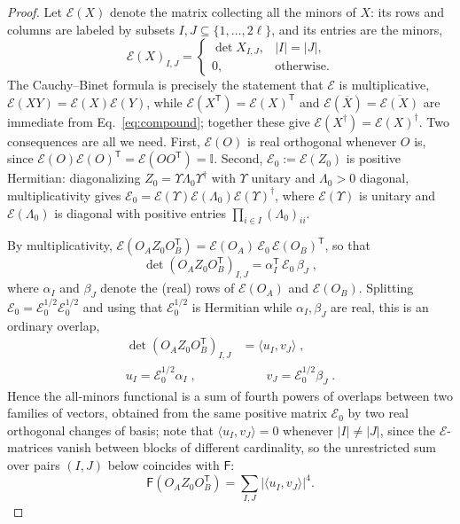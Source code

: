 \documentclass[prx,twocolumn,superscriptaddress,aps,10pt, frontmatterverbose, reprint,footinbib,longbibliography=true]{revtex4-2}
\newcommand{\trans}{\mathsf{T}}
\begin{document}
\begin{proof}
Let $\mathcal{E}(X)$ denote the matrix collecting all the minors of $X$: its rows and columns are labeled by subsets $I,J\subseteq \{1,\dots,2\ell\}$, and its entries are the minors,
\begin{equation}
    \mathcal{E}(X)_{I,J}=\begin{cases}\det X_{I,J}, & |I|=|J|,\\ 0,&\text{otherwise.}\end{cases}
    \label{eq:compound}
\end{equation}
The Cauchy--Binet formula is precisely the statement that $\mathcal{E}$ is multiplicative, $\mathcal{E}(XY)=\mathcal{E}(X)\mathcal{E}(Y)$, while $\mathcal{E}(X^{\trans})=\mathcal{E}(X)^{\trans}$ and $\mathcal{E}(\overline X)=\overline{\mathcal{E}(X)}$ are immediate from Eq.~\eqref{eq:compound}; together these give $\mathcal{E}(X^\dagger)=\mathcal{E}(X)^\dagger$. Two consequences are all we need. First, $\mathcal{E}(O)$ is real orthogonal whenever $O$ is, since $\mathcal{E}(O)\mathcal{E}(O)^{\trans}=\mathcal{E}(OO^{\trans})=\mathbb{I}$. Second, $\mathcal{E}_0:=\mathcal{E}(Z_0)$ is positive Hermitian: diagonalizing $Z_0=\Upsilon\Lambda_0\Upsilon^\dagger$ with $\Upsilon$ unitary and $\Lambda_0>0$  diagonal, multiplicativity gives $\mathcal{E}_0=\mathcal{E}(\Upsilon)\mathcal{E}(\Lambda_0)\mathcal{E}(\Upsilon)^\dagger$, where $\mathcal{E}(\Upsilon)$  is unitary and $\mathcal{E}(\Lambda_0)$ is diagonal with positive entries $\prod_{i\in I}(\Lambda_0)_{ii}$.


By multiplicativity, $\mathcal{E}(O_AZ_0O_B^{\trans})=\mathcal{E}(O_A)\,\mathcal{E}_0\,\mathcal{E}(O_B)^{\trans}$, so that
\begin{equation}
    \det\!\left(O_AZ_0O_B^{\trans}\right)_{I,J}=\alpha_I^{\trans}\,\mathcal{E}_0\,\beta_J\;,
\end{equation}
where $\alpha_I$ and $\beta_J$ denote the (real) rows of $\mathcal{E}(O_A)$ and $\mathcal{E}(O_B)$. Splitting $\mathcal{E}_0=\mathcal{E}_0^{1/2}\mathcal{E}_0^{1/2}$ and using that $\mathcal{E}_0^{1/2}$ is Hermitian while $\alpha_I,\beta_J$ are real, this is an ordinary overlap,
\begin{equation}
\begin{split}
    \det\!\left(O_AZ_0O_B^{\trans}\right)_{I,J}&=\langle u_I,v_J\rangle\;,\\
    u_I=\mathcal{E}_0^{1/2}\alpha_I\;,&\qquad v_J=\mathcal{E}_0^{1/2}\beta_J\;.
\end{split}
    \label{eq:minors-as-overlaps}
\end{equation} 
Hence the all-minors functional is a sum of fourth powers of overlaps between two families of vectors, obtained from the same positive matrix $\mathcal{E}_0$ by two real orthogonal changes of basis; note that $\langle u_I,v_J\rangle=0$ whenever $|I|\neq|J|$, since the $\mathcal{E}$-matrices vanish between blocks of different cardinality, so the unrestricted sum over pairs $(I,J)$ below coincides with $\mathsf{F}$:
\begin{equation}
    \mathsf{F}\!\left(O_AZ_0O_B^{\trans}\right)=\sum_{I,J}\left|\langle u_I,v_J\rangle\right|^4 .
    \label{eq:F-as-overlaps}
\end{equation}



\end{proof}
\end{document}
